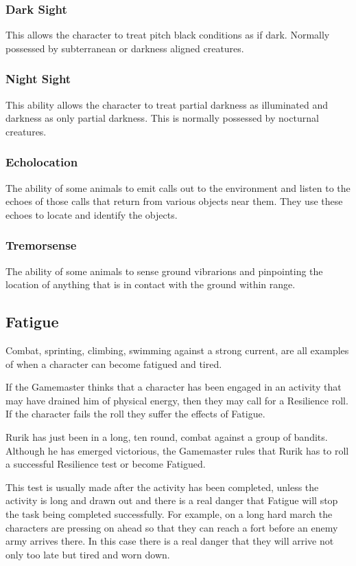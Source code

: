 \subsubsection{Dark Sight}
This allows the character to treat pitch black conditions as if dark. Normally possessed by subterranean or darkness aligned creatures.

\subsubsection{Night Sight}
This ability allows the character to treat partial darkness as illuminated and darkness as only partial darkness. This is normally possessed by nocturnal creatures.

\subsubsection{Echolocation}
The ability of some animals to emit calls out to the environment and listen to the echoes of those calls that return from various objects near them. They use these echoes to locate and identify the objects.

\subsubsection{Tremorsense}
The ability of some animals to sense ground vibrarions and pinpointing the location of anything that is in contact with the ground within range.


\subsection{Fatigue}
Combat, sprinting, climbing, swimming against a strong current, are all examples of when a character can become fatigued and tired.

If the Gamemaster thinks that a character has been engaged in an activity that may have drained him of physical energy, then they may call for a Resilience roll. If the character fails the roll they suffer the effects of Fatigue.

\begin{rpg-examplebox}
Rurik has just been in a long, ten round, combat against a group of bandits. Although he has emerged victorious, the Gamemaster rules that Rurik has to roll a successful Resilience test or become Fatigued.
\end{rpg-examplebox}

This test is usually made after the activity has been completed, unless the activity is long and drawn out and there is a real danger that Fatigue will stop the task being completed successfully. For example, on a long hard march the characters are pressing on ahead so that they can reach a fort before an enemy army arrives there. In this case there is a real danger that they will arrive not only too late but tired and worn down.

